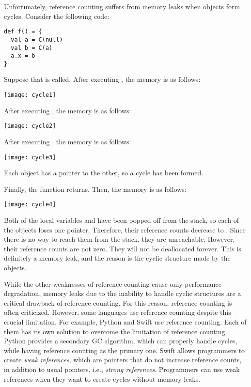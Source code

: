 Unfortunately, reference counting suffers from memory leaks when objects form
cycles. Consider the following code:

\begin{verbatim}
def f() = {
  val a = C(null)
  val b = C(a)
  a.x = b
}
\end{verbatim}

Suppose that  is called. After executing , the
memory is as follows:

\begin{center}
\texttt{[image: cycle1]}
\end{center}

After executing , the memory is as follows:

\begin{center}
\texttt{[image: cycle2]}
\end{center}

After executing , the memory is as follows:

\begin{center}
\texttt{[image: cycle3]}
\end{center}

Each object has a pointer to the other, so a cycle has been formed.

Finally, the function returns. Then, the memory is as follows:

\begin{center}
\texttt{[image: cycle4]}
\end{center}

Both of the local variables  and  have been popped off from the
stack, so each of the objects loses one pointer. Therefore, their reference
counts decrease to . Since there is no way to reach them from the stack,
they are unreachable. However, their reference counts are not zero. They will
not be deallocated forever. This is definitely a memory leak, and the reason is
the cyclic structure made by the objects.

While the other weaknesses of reference counting cause only performance
degradation, memory leaks due to the inability to handle cyclic structures are a
critical drawback of reference counting. For this reason, reference counting is
often criticized. However, some languages use reference counting despite this
crucial limitation. For example, Python and Swift use reference counting. Each
of them has its own solution to overcome the limitation of reference counting.
Python provides a secondary GC algorithm, which can properly handle cycles,
while having reference counting as the primary
one. Swift allows
programmers to create \textit{weak references}, which are
pointers that do not increase reference counts, in addition to usual pointers,
i.e., \textit{strong references}.
Programmers can use weak references when they want to create cycles without
memory leaks.

